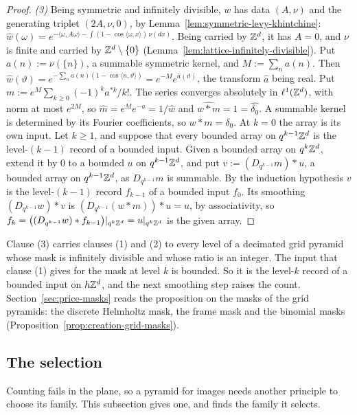 \begin{proof}
\emph{(3)} Being symmetric and infinitely divisible, $w$ has \Levy{} data $(A, \nu)$ and the
generating triplet $(2A, \nu, 0)$, by Lemma~\ref{lem:symmetric-levy-khintchine}:
$\widehat w(\omega) = e^{-\langle\omega, A\omega\rangle - \int(1 - \cos\langle\omega, x\rangle)\,\nu(dx)}$.
Being carried by $\mathbb{Z}^d$, it has $A = 0$, and $\nu$ is finite and carried by
$\mathbb{Z}^d \setminus \{0\}$ (Lemma~\ref{lem:lattice-infinitely-divisible}). Put $a(n) := \nu(\{n\})$, a
summable symmetric kernel, and $M := \sum_na(n)$. Then
$\widehat w(\vartheta) = e^{-\sum_na(n)(1 - \cos\langle n, \vartheta\rangle)} = e^{-M}e^{\widehat a(\vartheta)}$,
the transform $\widehat a$ being real. Put $m := e^M\sum_{k \ge 0}(-1)^ka^{*k}/k!$. The series
converges absolutely in $\ell^1(\mathbb{Z}^d)$, with norm at most $e^{2M}$, so
$\widehat m = e^Me^{-\widehat a} = 1/\widehat w$ and $\widehat{w * m} = 1 = \widehat{\delta_0}$. A
summable kernel is determined by its Fourier coefficients, so $w * m = \delta_0$. At $k = 0$ the
array is its own input. Let $k \ge 1$, and suppose that every bounded array on $q^{k-1}\mathbb{Z}^d$ is the
level-$(k-1)$ record of a bounded input. Given a bounded array on $q^k\mathbb{Z}^d$, extend it by $0$ to a
bounded $u$ on $q^{k-1}\mathbb{Z}^d$, and put $v := (D_{q^{k-1}}m) * u$, a bounded array on
$q^{k-1}\mathbb{Z}^d$, as $D_{q^{k-1}}m$ is summable. By the induction hypothesis $v$ is the level-$(k-1)$
record $f_{k-1}$ of a bounded input $f_0$. Its smoothing $(D_{q^{k-1}}w) * v$ is
$(D_{q^{k-1}}(w * m)) * u = u$, by associativity, so
$f_k = \bigl((D_{q^{k-1}}w) * f_{k-1}\bigr)|_{q^k\mathbb{Z}^d} = u|_{q^k\mathbb{Z}^d}$ is the given array.
\end{proof}

Clause (3) carries clauses (1) and (2) to every level of a decimated grid pyramid whose mask is
infinitely divisible and whose ratio is an integer. The input that clause (1) gives for the mask at
level $k$ is bounded. So it is the level-$k$ record of a bounded input on $h\mathbb{Z}^d$, and the next
smoothing step raises the count. Section~\ref{sec:price-masks} reads the proposition on the masks of
the grid pyramids: the discrete Helmholtz mask, the frame mask and the binomial masks
(Proposition~\ref{prop:creation-grid-masks}).

\subsection{The selection}
\label{sec:matern-selection}

Counting fails in the plane, so a pyramid for images needs another principle to choose its family.
This subsection gives one, and finds the family it selects.

